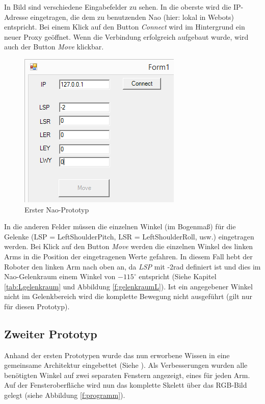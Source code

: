 In Bild  sind verschiedene Eingabefelder zu sehen. In die oberste wird die IP-Adresse eingetragen, die dem zu benutzenden Nao (hier: lokal in Webots) entspricht. Bei einem Klick auf den Button \textit{Connect} wird im Hintergrund ein neuer Proxy geöffnet. Wenn die Verbindung erfolgreich aufgebaut wurde, wird auch der Button \textit{Move} klickbar.
\begin{figure}[H]						
	\centering							
	\includegraphics[scale=0.8]{Bilder/nao_prototyp1.PNG}
	\caption{Erster Nao-Prototyp}						
	\label{f:nao_prototyp1}						
\end{figure}
\noindent
In die anderen Felder müssen die einzelnen Winkel (im Bogenmaß) für die Gelenke (LSP = LeftShoulderPitch, LSR = LeftShoulderRoll, usw.) eingetragen werden. Bei Klick auf den Button \textit{Move} werden die einzelnen Winkel des linken Arms in die Position der eingetragenen Werte gefahren. In diesem Fall hebt der Roboter den linken Arm nach oben an, da \textit{LSP} mit -2rad definiert ist und dies im Nao-Gelenkraum einem Winkel von $-115^{\circ}$ entspricht (Siehe Kapitel \ref{tab:Lgelenkraum} und Abbildung \ref{f:gelenkraumL}). Ist ein angegebener Winkel nicht im Gelenkbereich wird die komplette Bewegung nicht ausgeführt (gilt nur für diesen Prototyp).

\subsection{Zweiter Prototyp}
Anhand der ersten Prototypen wurde das nun erworbene Wissen in eine gemeinsame Architektur eingebettet (Siehe ). Als Verbesserungen wurden alle benötigten Winkel auf zwei separaten Fenstern angezeigt, eines für jeden Arm. Auf der Fensteroberfläche wird nun das komplette Skelett über das RGB-Bild gelegt (siehe Abbildung \ref{f:programm}).


